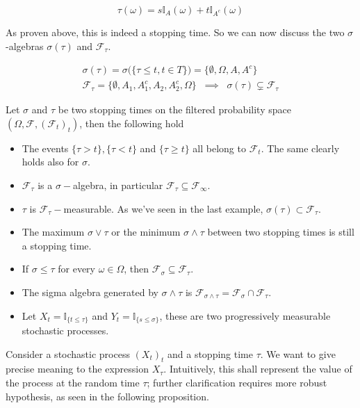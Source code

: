 \begin{equation*}
    \tau(\omega) = s \mathbb{I}_A(\omega) + t \mathbb{I}_{A^c}(\omega)
\end{equation*}

As proven above, this is indeed a stopping time. So we can now discuss the two $\sigma$-algebras $\sigma(\tau)$ and $\mathcal{F}_{\tau}$. 

\begin{gather*}
    \sigma(\tau) = \sigma\big(\{ \tau \leq t, t \in T\}\big) = \big\{ \emptyset, \Omega, A, A^c \big\} \\
    \mathcal{F}_{\tau} = \Big\{ \emptyset, A_1, A_1^c, A_2, A_2^c, \Omega \Big\} \;\; \implies \;\; \sigma(\tau) \subsetneq \mathcal{F}_{\tau}
\end{gather*}

\begin{proposition}
    Let $\sigma$ and $\tau$ be two stopping times on the filtered probability space $(\Omega, \mathcal{F}, (\mathcal{F}_t)_t)$, then the following hold
    \begin{itemize}
        \item The events $\{ \tau > t \}, \{ \tau < t\}$ and $\{ \tau \geq t\}$ all belong to $\mathcal{F}_t$. The same clearly holds also for $\sigma$.
        \item $\mathcal{F}_{\tau}$ is a $\sigma-$algebra, in particular $\mathcal{F}_{\tau} \subseteq \mathcal{F}_{\infty}$. 
        \item $\tau$ is $\mathcal{F}_{\tau}-$measurable. As we've seen in the last example, $\sigma(\tau) \subset \mathcal{F}_{\tau}$.
        \item The maximum $\sigma \vee \tau$ or the minimum $\sigma \wedge \tau$ between two stopping times is still a stopping time.
        \item If $\sigma \leq \tau$ for every $\omega \in \Omega$, then $\mathcal{F}_{\sigma} \subseteq \mathcal{F}_{\tau}$. 
        \item The sigma algebra generated by $\sigma \wedge \tau$ is $\mathcal{F}_{\sigma \wedge \tau} = \mathcal{F}_{\sigma} \cap \mathcal{F}_{\tau}$. 
        \item Let $X_t = \mathbb{I}_{\{ t \leq \tau \}}$ and $Y_t = \mathbb{I}_{\{ s \leq \sigma \}}$, these are two progressively measurable stochastic processes.
    \end{itemize}
\end{proposition}

Consider a stochastic process $(X_t)_t$ and a stopping time $\tau$. We want to give precise meaning to the expression $X_{\tau}$. Intuitively, this shall represent the value of the process at the random time $\tau$; further clarification requires more robust hypothesis, as seen in the following proposition.

